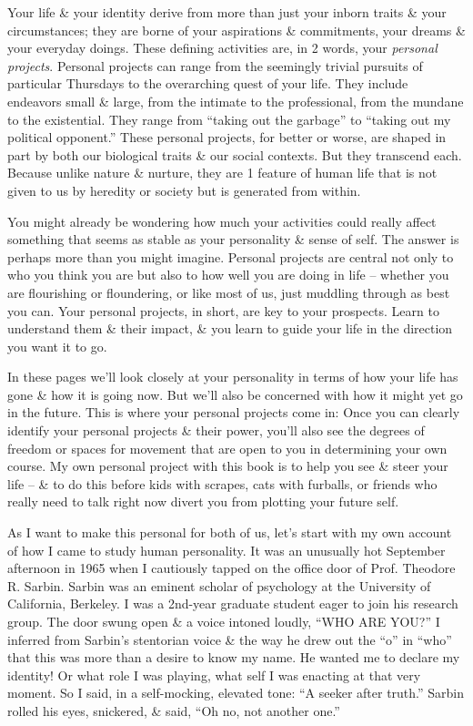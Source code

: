 \documentclass{article}
\numberwithin{equation}{section}
\begin{document}
Your life \& your identity derive from more than just your inborn traits \& your circumstances; they are borne of your aspirations \& commitments, your dreams \& your everyday doings. These defining activities are, in 2 words, your \textit{personal projects}. Personal projects can range from the seemingly trivial pursuits of particular Thursdays to the overarching quest of your life. They include endeavors small \& large, from the intimate to the professional, from the mundane to the existential. They range from ``taking out the garbage'' to ``taking out my political opponent.'' These personal projects, for better or worse, are shaped in part by both our biological traits \& our social contexts. But they transcend each. Because unlike nature \& nurture, they are 1 feature of human life that is not given to us by heredity or society but is generated from within.

You might already be wondering how much your activities could really affect something that seems as stable as your personality \& sense of self. The answer is perhaps more than you might imagine. Personal projects are central not only to who you think you are but also to how well you are doing in life -- whether you are flourishing or floundering, or like most of us, just muddling through as best you can. Your personal projects, in short, are key to your prospects. Learn to understand them \& their impact, \& you learn to guide your life in the direction you want it to go.

In these pages we'll look closely at your personality in terms of how your life has gone \& how it is going now. But we'll also be concerned with how it might yet go in the future. This is where your personal projects come in: Once you can clearly identify your personal projects \& their power, you'll also see the degrees of freedom or spaces for movement that are open to you in determining your own course. My own personal project with this book is to help you see \& steer your life -- \& to do this before kids with scrapes, cats with furballs, or friends who really need to talk right now divert you from plotting your future self.

As I want to make this personal for both of us, let's start with my own account of how I came to study human personality. It was an unusually hot September afternoon in 1965 when I cautiously tapped on the office door of Prof. Theodore R. Sarbin. Sarbin was an eminent scholar of psychology at the University of California, Berkeley. I was a 2nd-year graduate student eager to join his research group. The door swung open \& a voice intoned loudly, ``WHO ARE YOU?'' I inferred from Sarbin's stentorian voice \& the way he drew out the ``o'' in ``who'' that this was more than a desire to know my name. He wanted me to declare my identity! Or what role I was playing, what self I was enacting at that very moment. So I said, in a self-mocking, elevated tone: ``A seeker after truth.'' Sarbin rolled his eyes, snickered, \& said, ``Oh no, not another one.''
\end{document}
